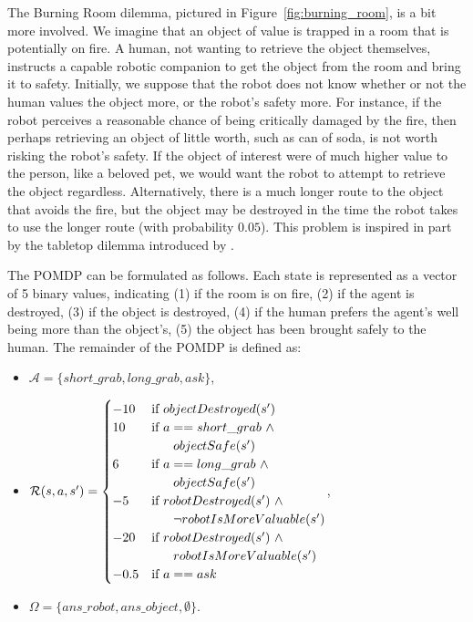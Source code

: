 \documentclass[11pt]{article}
\begin{document}
{The Burning Room dilemma, pictured in Figure~\ref{fig:burning_room}, is a bit more involved. We imagine that an object of value is trapped in a room that is potentially on fire. A human, not wanting to retrieve the object themselves, instructs a capable robotic companion to get the object from the room and bring it to safety. Initially, we suppose that the robot does not know whether or not the human values the object more, or the robot's safety more. For instance, if the robot perceives a reasonable chance of being critically damaged by the fire, then perhaps retrieving an object of little worth, such as can of soda, is not worth risking the robot's safety. If the object of interest were of much higher value to the person, like a beloved pet, we would want the robot to attempt to retrieve the object regardless. Alternatively, there is a much longer route to the object that avoids the fire, but the object may be destroyed in the time the robot takes to use the longer route (with probability $0.05$). This problem is inspired in part by the tabletop dilemma introduced by \cite{briggs2015sorry}.

The POMDP can be formulated as follows. Each state is represented as a vector of 5 binary values, indicating (1) if the room is on fire, (2) if the agent is destroyed, (3) if the object is destroyed, (4) if the human prefers the agent's well being more than the object's, (5) the object has been brought safely to the human.
The remainder of the POMDP is defined as:
\begin{itemize}
\item[] $\mathcal{A} = \{short\_grab, long\_grab, ask \}$,
\item[] $\mathcal{R}(s, a,s') =
 \begin{cases} 
-10 & \mbox{if } objectDestroyed(s') \\
10 & \mbox{if } a == short\_grab\ \wedge\ \\ & \hspace{6mm} objectSafe(s') \\
6 & \mbox{if } a == long\_grab\ \wedge\ \\ & \hspace{6mm} objectSafe(s') \\
-5 & \mbox{if } robotDestroyed(s')\ \wedge \\ & \hspace{6mm} \neg robotIsMoreValuable(s') \\
-20 & \mbox{if } robotDestroyed(s')\ \wedge \\ & \hspace{6mm} robotIsMoreValuable(s') \\
-0.5 & \mbox{if } a == ask
\end{cases}$,
\item[] $\Omega = \{ans\_robot, ans\_object, \emptyset \}$.
\end{itemize}

}
\end{document}
